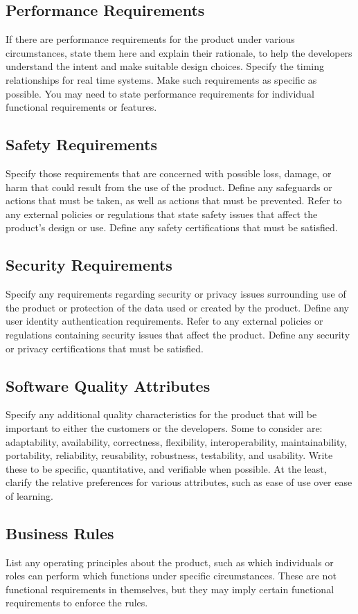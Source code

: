 \documentclass[a4paper,10pt]{article}
\begin{document}
\subsection{Performance Requirements}
If there are performance requirements for the product under various circumstances, state them here and explain their rationale, to help the developers understand the intent and make suitable design choices. Specify the timing relationships for real time systems. Make such requirements as specific as possible. You may need to state performance requirements for individual functional requirements or features.
\subsection{Safety Requirements}
Specify those requirements that are concerned with possible loss, damage, or harm that could result from the use of the product. Define any safeguards or actions that must be taken, as well as actions that must be prevented. Refer to any external policies or regulations that state safety issues that affect the product’s design or use. Define any safety certifications that must be satisfied.
\subsection{Security Requirements}
Specify any requirements regarding security or privacy issues surrounding use of the product or protection of the data used or created by the product. Define any user identity authentication requirements. Refer to any external policies or regulations containing security issues that affect the product. Define any security or privacy certifications that must be satisfied.
\subsection{Software Quality Attributes}
Specify any additional quality characteristics for the product that will be important to either the customers or the developers. Some to consider are: adaptability, availability, correctness, flexibility, interoperability, maintainability, portability, reliability, reusability, robustness, testability, and usability. Write these to be specific, quantitative, and verifiable when possible. At the least, clarify the relative preferences for various attributes, such as ease of use over ease of learning.
\subsection{Business Rules}
List any operating principles about the product, such as which individuals or roles can perform which functions under specific circumstances. These are not functional requirements in themselves, but they may imply certain functional requirements to enforce the rules.
\end{document}
